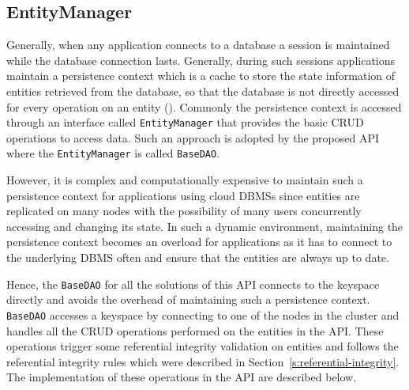 	\subsection{EntityManager}
	Generally, when any application connects to a database a session is maintained
	while the database connection lasts.  Generally, during such sessions applications maintain
	a persistence context which is a cache to store the state information of
	entities retrieved from the database, so that the database is not directly
	accessed for every operation on an entity (). 
	Commonly the persistence context is accessed through an interface called
	\texttt{EntityManager} that provides the basic \ac{CRUD}
	operations to access data.  Such an approach is adopted by the proposed \ac{API} where the
	\texttt{EntityManager} is called \texttt{BaseDAO}.  
	
	However, it
	is complex and computationally expensive to maintain such a persistence context
	for applications using cloud \acp{DBMS} since entities are replicated on many
	nodes with the possibility of many users concurrently accessing and changing its
	state.  In such a dynamic environment, maintaining the persistence context
	becomes an overload for applications as it has to
	 connect to the underlying \ac{DBMS} often and ensure that the entities are
	 always up to date. 
	 
	Hence, the \texttt{BaseDAO} for all the solutions of this \ac{API} connects to
	the keyspace directly and avoids the overhead of maintaining such a persistence context. 
	\texttt{BaseDAO} accesses a keyspace by connecting to one of the nodes in the
	cluster and handles all the \ac{CRUD} operations performed on the entities in the
	\ac{API}. These operations trigger some referential
	integrity validation on entities and follows the
	referential integrity rules which were described in
	Section~\ref{s:referential-integrity}. 
	The implementation of these operations in the \ac{API} are described below.   %
		
